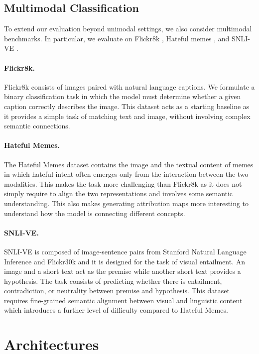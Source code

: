 \subsection{Multimodal Classification}

To extend our evaluation beyond unimodal settings, we also consider multimodal benchmarks. In particular, we evaluate on Flickr8k \cite{flickr8k}, Hateful memes \cite{memes}, and SNLI-VE \cite{snli_ve}.

\paragraph{Flickr8k.}
Flickr8k \cite{flickr8k} consists of images paired with natural language captions. We formulate a binary classification task in which the model must determine whether a given caption correctly describes the image. This dataset acts as a starting baseline as it provides a simple task of matching text and image, without involving complex semantic connections.

\paragraph{Hateful Memes.}
The Hateful Memes dataset \cite{memes} contains the image and the textual content of memes in which hateful intent often emerges only from the interaction between the two modalities. This makes the task more challenging than Flickr8k as it does not simply require to align the two representations and involves some semantic understanding. This also makes generating attribution maps more interesting to understand how the model is connecting different concepts.

\paragraph{SNLI-VE.}
SNLI-VE \cite{snli_ve} is composed of image-sentence pairs from Stanford Natural Language Inference \cite{snli} and Flickr30k \cite{flickr30k} and it is designed for the task of visual entailment. An image and a short text act as the premise while another short text provides a hypothesis. The task consists of predicting whether there is entailment, contradiction, or neutrality between premise and hypothesis. This dataset requires fine-grained semantic alignment between visual and linguistic content which introduces a further level of difficulty compared to Hateful Memes.



\section{Architectures}


